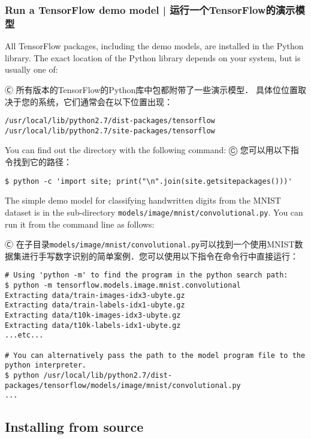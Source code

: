 \subsubsection {Run a TensorFlow demo model  |  运行一个TensorFlow的演示模型}

All TensorFlow packages, including the demo models, are installed in the Python library. The exact location of the Python library depends on your system, but is usually one of:

Ⓒ 所有版本的TensorFlow的Python库中包都附带了一些演示模型． 具体位位置取决于您的系统，它们通常会在以下位置出现：

\begin{lstlisting}
/usr/local/lib/python2.7/dist-packages/tensorflow
/usr/local/lib/python2.7/site-packages/tensorflow
\end{lstlisting}

You can find out the directory with the following command:
Ⓒ 您可以用以下指令找到它的路径：

\begin{lstlisting}
$ python -c 'import site; print("\n".join(site.getsitepackages()))'
\end{lstlisting}

The simple demo model for classifying handwritten digits from the MNIST dataset is in the sub-directory \lstinline{models/image/mnist/convolutional.py}. You can run it from the command line as follows:

Ⓒ 在子目录\lstinline{models/image/mnist/convolutional.py}可以找到一个使用MNIST数据集进行手写数字识别的简单案例．您可以使用以下指令在命令行中直接运行：

\begin{lstlisting}
# Using 'python -m' to find the program in the python search path:
$ python -m tensorflow.models.image.mnist.convolutional
Extracting data/train-images-idx3-ubyte.gz
Extracting data/train-labels-idx1-ubyte.gz
Extracting data/t10k-images-idx3-ubyte.gz
Extracting data/t10k-labels-idx1-ubyte.gz
...etc...

# You can alternatively pass the path to the model program file to the python interpreter.
$ python /usr/local/lib/python2.7/dist-packages/tensorflow/models/image/mnist/convolutional.py
...
\end{lstlisting}


%
\subsection {Installing from source}

